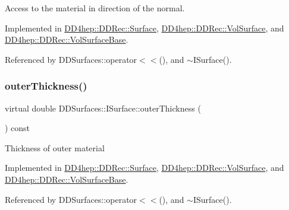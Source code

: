 Access to the material in direction of the normal. 



Implemented in \hyperlink{class_d_d4hep_1_1_d_d_rec_1_1_surface_a510bdf9b19e1b4f8dad0b8770e513826}{D\+D4hep\+::\+D\+D\+Rec\+::\+Surface}, \hyperlink{class_d_d4hep_1_1_d_d_rec_1_1_vol_surface_af554b5cbe4e227c37443c5bddbc3ca3b}{D\+D4hep\+::\+D\+D\+Rec\+::\+Vol\+Surface}, and \hyperlink{class_d_d4hep_1_1_d_d_rec_1_1_vol_surface_base_af05dcf58c48775e1a5a7b0acf59db1c0}{D\+D4hep\+::\+D\+D\+Rec\+::\+Vol\+Surface\+Base}.



Referenced by D\+D\+Surfaces\+::operator$<$$<$(), and $\sim$\+I\+Surface().

\hypertarget{class_d_d_surfaces_1_1_i_surface_aa2559a8904e474835c5d24c243a44909}{}\label{class_d_d_surfaces_1_1_i_surface_aa2559a8904e474835c5d24c243a44909} 
\subsubsection{\texorpdfstring{outer\+Thickness()}{outerThickness()}}
{\footnotesize\ttfamily virtual double D\+D\+Surfaces\+::\+I\+Surface\+::outer\+Thickness (\begin{DoxyParamCaption}{ }\end{DoxyParamCaption}) const\hspace{0.3cm}{\ttfamily [pure virtual]}}

Thickness of outer material 

Implemented in \hyperlink{class_d_d4hep_1_1_d_d_rec_1_1_surface_a55a7d1f21ef278115e16cbb353ab01f7}{D\+D4hep\+::\+D\+D\+Rec\+::\+Surface}, \hyperlink{class_d_d4hep_1_1_d_d_rec_1_1_vol_surface_ac2113d966dce09b9f714a14a0e0f45c8}{D\+D4hep\+::\+D\+D\+Rec\+::\+Vol\+Surface}, and \hyperlink{class_d_d4hep_1_1_d_d_rec_1_1_vol_surface_base_a1a5c66bc7c13b15642720ea310b03f6f}{D\+D4hep\+::\+D\+D\+Rec\+::\+Vol\+Surface\+Base}.



Referenced by D\+D\+Surfaces\+::operator$<$$<$(), and $\sim$\+I\+Surface().

\hypertarget{class_d_d_surfaces_1_1_i_surface_aab772d11a61d7ae966d535be0da2a626}{}\label{class_d_d_surfaces_1_1_i_surface_aab772d11a61d7ae966d535be0da2a626} 
